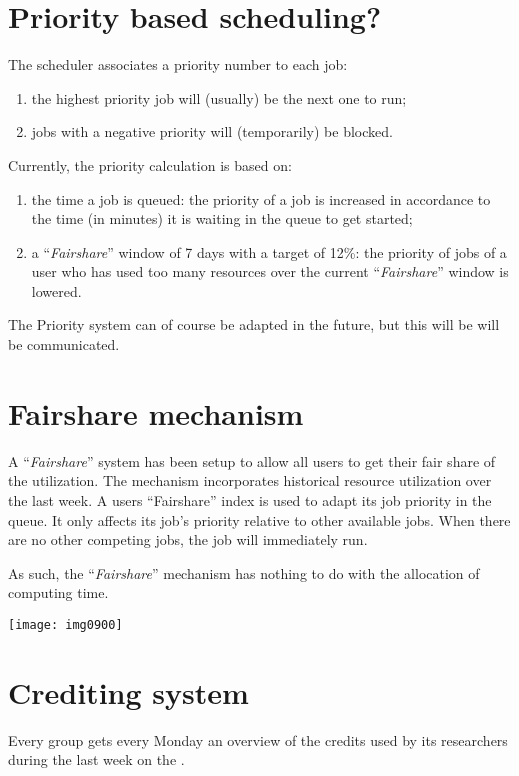 \section{Priority based scheduling?}

The scheduler associates a priority number to each job:

\begin{enumerate}
\item  the highest priority job will (usually) be the next one to run;
\item  jobs with a negative priority will (temporarily) be blocked.
\end{enumerate}

Currently, the priority calculation is based on:

\begin{enumerate}
\item  the time a job is queued: the priority of a job is increased in accordance to the time (in minutes) it is waiting in the queue to get started;
\item  a ``\emph{Fairshare}'' window of 7 days with a target of 12\%: the priority of jobs of a user who has used too many resources over the current ``\emph{Fairshare}'' window is lowered.
\end{enumerate}

The Priority system can of course be adapted in the future, but this will be will be communicated.


\section{Fairshare mechanism}

A ``\emph{Fairshare}'' system has been setup to allow all users to get their
fair share of the \hpc utilization.  The mechanism incorporates historical
resource utilization over the last week.  A users ``Fairshare'' index is used
to adapt its job priority in the queue.  It only affects its job's priority
relative to other available jobs. When there are no other competing jobs, the
job will immediately run.

As such, the ``\emph{Fairshare}'' mechanism has nothing to do with the
allocation of computing time.

\texttt{[image: img0900]}


\section{Crediting system}

Every group gets every Monday an overview of the credits used by its researchers during the last week on the \hpc.
